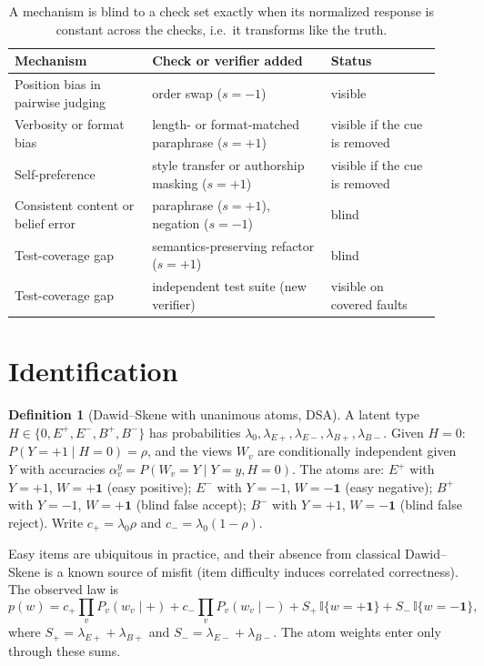 \documentclass[11pt]{article}
\theoremstyle{definition}
\newtheorem{definition}{Definition}
\theoremstyle{remark}
\newcommand{\one}{\mathbf{1}}
\begin{document}
\begin{table}[t]
\centering\small
\begin{tabular}{@{}>{\raggedright\arraybackslash}p{0.30\linewidth}>{\raggedright\arraybackslash}p{0.39\linewidth}>{\raggedright\arraybackslash}p{0.24\linewidth}@{}}
\toprule
Mechanism & Check or verifier added & Status\\
\midrule
Position bias in pairwise judging & order swap ($s=-1$) & visible\\
Verbosity or format bias & length- or format-matched paraphrase ($s=+1$) & visible if the cue is removed\\
Self-preference & style transfer or authorship masking ($s=+1$) & visible if the cue is removed\\
Consistent content or belief error & paraphrase ($s=+1$), negation ($s=-1$) & blind\\
Test-coverage gap & semantics-preserving refactor ($s=+1$) & blind\\
Test-coverage gap & independent test suite (new verifier) & visible on covered faults\\
\bottomrule
\end{tabular}
\caption{A mechanism is blind to a check set exactly when its normalized response is constant across the checks, i.e.\ it transforms like the truth.}
\label{tab:mech}
\end{table}

\section{Identification}

\begin{definition}[Dawid--Skene with unanimous atoms, DSA]
A latent type $H\in\{0,E^+,E^-,B^+,B^-\}$ has probabilities $\lambda_0,\lambda_{E+},\lambda_{E-},\lambda_{B+},\lambda_{B-}$.
Given $H=0$: $P(Y=+1\mid H=0)=\rho$, and the views $W_v$ are conditionally independent given $Y$ \cite{dawid1979} with accuracies $\alpha_v^{y}=P(W_v=Y\mid Y=y,H=0)$.
The atoms are: $E^+$ with $Y=+1$, $W=+\one$ (easy positive); $E^-$ with $Y=-1$, $W=-\one$ (easy negative); $B^+$ with $Y=-1$, $W=+\one$ (blind false accept); $B^-$ with $Y=+1$, $W=-\one$ (blind false reject).
Write $c_+=\lambda_0\rho$ and $c_-=\lambda_0(1-\rho)$.
\end{definition}

Easy items are ubiquitous in practice, and their absence from classical Dawid--Skene is a known source of misfit (item difficulty induces correlated correctness). The observed law is
\begin{equation}\label{eq:law}
p(w)=c_+\!\prod_v P_v(w_v\mid +)+c_-\!\prod_v P_v(w_v\mid -)+S_+\,\mathbb{I}\{w=+\one\}+S_-\,\mathbb{I}\{w=-\one\},
\end{equation}
where $S_+=\lambda_{E+}+\lambda_{B+}$ and $S_-=\lambda_{E-}+\lambda_{B-}$. The atom weights enter only through these sums.
\end{document}
